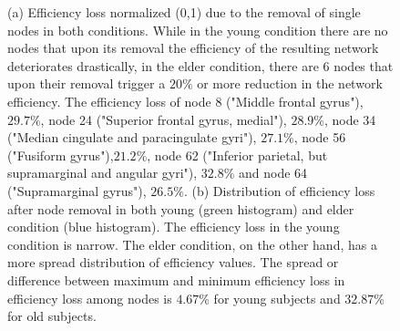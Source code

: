 \documentclass[12pt,a4paper]{article}
\begin{document}
\begin{figure}[!ht]
    \hfill
    \caption{\small (a) Efficiency loss normalized (0,1) due to the removal of single nodes in both conditions. While in the young condition there are no nodes that upon its removal the efficiency of the resulting network deteriorates drastically, in the elder condition, there are 6 nodes that upon their removal trigger a $20\%$ or more reduction in the network efficiency. The efficiency loss of node 8 ("Middle frontal gyrus"), $29.7\%$, node 24 ("Superior frontal gyrus, medial"), $28.9\%$, node 34 ("Median cingulate and paracingulate gyri"), $27.1\%$, node 56 ("Fusiform gyrus"),$21.2\%$, node 62 ("Inferior parietal, but supramarginal and angular gyri"), $32.8\%$ and node 64 ("Supramarginal gyrus"), $26.5\%$.   
  \small (b) Distribution of efficiency loss after node removal in both young (green histogram) and elder condition (blue histogram). The efficiency loss in the young condition is narrow. The elder condition, on the other hand, has a more spread distribution of efficiency values. 
The spread or difference between maximum and minimum efficiency loss in efficiency loss among nodes is $4.67\%$ for young subjects and $32.87\%$ for old subjects.}
    \label{fig:gauss}
  \end{figure} 
\end{document}
